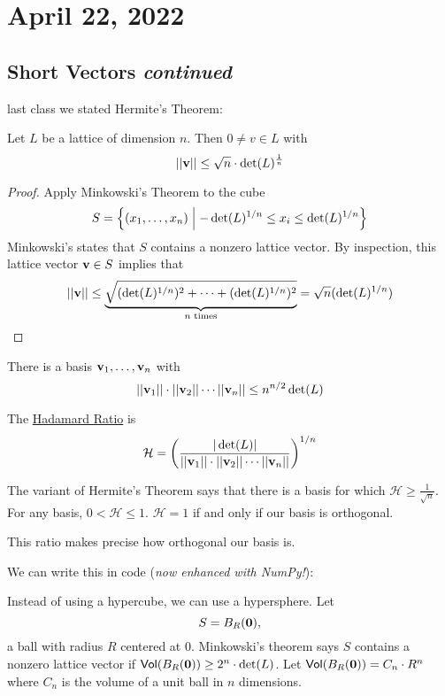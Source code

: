 \section{April 22, 2022}
\subsection{Short Vectors \emph{continued}}
\recall last class we stated Hermite's Theorem:
\begin{theorem*}
    Let $L$ be a lattice of dimension $n$. Then $0\neq v\in L$ with
    \[||\mathbf{v|}|\leq \sqrt{n}\cdot \det(L)^\frac{1}{n}\]
\end{theorem*}
\begin{proof}
    Apply Minkowski's Theorem to the cube
    \[S = \left\{ (x_1, \dots, x_n) \Bigm\vert -\det(L)^{1/n}\leq x_i \leq \det(L)^{1/n} \right\}\]
    Minkowski's states that $S$ contains a nonzero lattice vector. By inspection, this lattice vector $\mathbf{v}\in S$ implies that
    \[||\mathbf{v}|| \leq \underbrace{\sqrt{(\det(L)^{1/n})^2 + \cdots + (\det(L)^{1/n})^2}}_{n\text{ times}} = \sqrt{n}(\det(L)^{1/n})\]
\end{proof}

\begin{theorem*}
    There is a basis $\mathbf{v}_1, \dots, \mathbf{v}_n$ with
    \[||\mathbf{v}_1||\cdot||\mathbf{v}_2||\cdots ||\mathbf{v}_n|| \leq n^{n/2}\det(L)\]
\end{theorem*}
\begin{definition}
    The \ul{Hadamard Ratio} is
    \[\mathcal{H} = \left( \frac{|\det(L)|}{||\mathbf{v}_1||\cdot||\mathbf{v}_2||\cdots ||\mathbf{v}_n||} \right)^{1/n}\]
\end{definition}

The variant of Hermite's Theorem says that there is a basis for which $\mathcal{H}\geq \frac{1}{\sqrt{n}}$. For any basis, $0 < \mathcal{H}\leq 1$. $\mathcal{H} = 1$ if and only if our basis is orthogonal.

This ratio makes precise how orthogonal our basis is.

We can write this in code (\emph{now enhanced with NumPy!}):


Instead of using a hypercube, we can use a hypersphere. Let
\[S = B_R(\mathbf{0}),\]
a ball with radius $R$ centered at $0$. Minkowski's theorem says $S$ contains a nonzero lattice vector if $\textsf{Vol}(B_R(\mathbf{0})) \geq 2^n\cdot \det(L)$. Let $\textsf{Vol}(B_R(\mathbf{0})) = C_n\cdot R^n$ where $C_n$ is the volume of a unit ball in $n$ dimensions.

